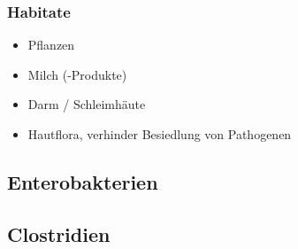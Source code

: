 \subsubsection*{Habitate}
\begin{itemize}
	\item Pflanzen
	\item Milch (-Produkte)
	\item Darm / Schleimhäute
	\item Hautflora, verhinder Besiedlung von Pathogenen
\end{itemize}

\subsection{Enterobakterien}

\subsection{Clostridien}
